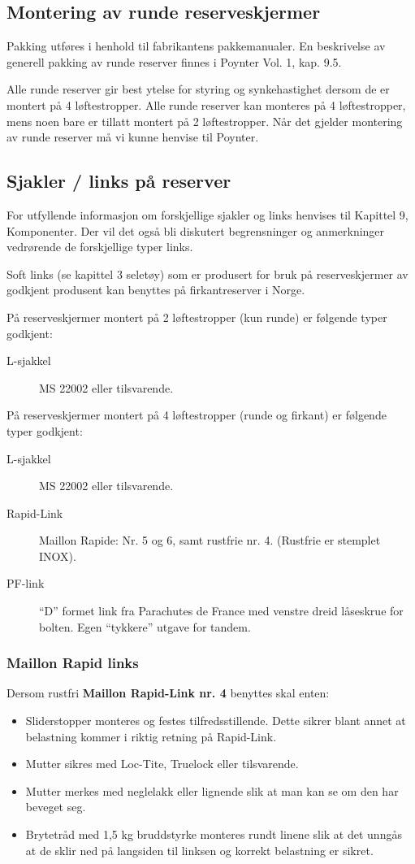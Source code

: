 \subsection{Montering av runde reserveskjermer}
Pakking utføres i henhold til fabrikantens pakkemanualer. En beskrivelse av generell pakking av runde reserver finnes i Poynter Vol. 1, kap. 9.5.

Alle runde reserver gir best ytelse for styring og synkehastighet dersom de er montert på 4 løftestropper. Alle runde reserver kan monteres på 4 løftestropper, mens noen bare er tillatt montert på 2 løftestropper. Når det gjelder montering av runde reserver må vi kunne henvise til Poynter.

\subsection{Sjakler / links på reserver}
For utfyllende informasjon om forskjellige sjakler og links henvises til Kapittel 9, Komponenter. Der vil det også bli diskutert begrensninger og anmerkninger vedrørende de forskjellige typer links.

Soft links (se kapittel 3 seletøy) som er produsert for bruk på reserveskjermer av godkjent produsent kan benyttes på firkantreserver i Norge.

På reserveskjermer montert på 2 løftestropper (kun runde) er følgende typer godkjent:
\begin{description}
	\item[L-sjakkel] MS 22002 eller tilsvarende.
\end{description}

På reserveskjermer montert på 4 løftestropper (runde og firkant) er følgende typer godkjent:
\begin{description}
	\item[L-sjakkel] MS 22002 eller tilsvarende.
	\item[Rapid-Link] Maillon Rapide: Nr. 5 og 6, samt rustfrie nr. 4. (Rustfrie er stemplet INOX).
	\item[PF-link] ``D'' formet link fra Parachutes de France med venstre dreid låseskrue for bolten. Egen ``tykkere'' utgave for tandem.
\end{description}

\subsubsection{Maillon Rapid links}
Dersom rustfri \textbf{Maillon Rapid-Link nr. 4} benyttes skal enten:
\begin{itemize}
	\item Sliderstopper monteres og festes tilfredsstillende. Dette sikrer blant annet at belastning kommer i riktig retning på Rapid-Link.
	\item Mutter sikres med Loc-Tite, Truelock eller tilsvarende.
	\item Mutter merkes med neglelakk eller lignende slik at man kan se om den har beveget seg.
	\item Brytetråd med 1,5 kg bruddstyrke monteres rundt linene slik at det unngås at de sklir ned på langsiden til linksen og korrekt belastning er sikret.
\end{itemize}

